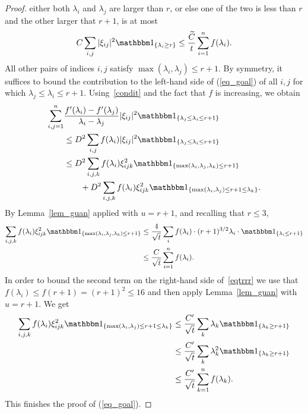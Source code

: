 \documentclass[12pt,a4paper]{article}
\renewcommand{\tilde}{\widetilde}
\theoremstyle{definition}
\begin{document}
\begin{proof}
either both $\lambda_i$ and $\lambda_j$ are larger than $r$, or
else one of the two is less than $r$ and the other larger that $r+1$, is at most
$$ C \sum_{i, j} \vert\xi_{ij} \vert^2  \mathbbm 1_{\{ \lambda_i \geq r \} } \leq \frac{\tilde{C}}{t} \sum_{i=1}^n f(\lambda_i). $$
All other pairs of indices $i,j$ satisfy $\max (\lambda_i, \lambda_j ) \leq r+1$. By symmetry, it suffices to bound the contribution to the left-hand side of (\ref{eq_goal}) 
of all $i,j$ for which $\lambda_j \leq \lambda_i \leq r+1$.
Using~\eqref{condit} and
the fact that $f$ is increasing, we obtain
\begin{equation}\label{eqtrrr}
\begin{split}
\sum_{i,j=1}^n & \frac{ f'(\lambda_i)-f'(\lambda_j) }{ \lambda_i -\lambda_j }
|\xi_{ij}|^2 \mathbbm  1_{ \{  \lambda_j \leq \lambda_i \leq r+1 \} } \\
& \leq D^2 \sum_{i,j}  f(\lambda_i) \vert \xi_{ij} \vert^2 \mathbbm  1_{ \{ \lambda_j \leq \lambda_i \leq r+1 \} }   \\
& \leq  D^2 \sum_{i,j,k} f(\lambda_i) \xi_{ijk}^2 \mathbbm  1_{ \{ \max(\lambda_i,\lambda_j,\lambda_k) \leq r+1 \} } \\
& \qquad + D^2 \sum_{i,j,k} f(\lambda_i) \xi_{ijk}^2 \mathbbm  1_{ \{ \max(\lambda_i,\lambda_j)\leq r+1 \leq \lambda_k \} }.
\end{split}
\end{equation}
By Lemma~\ref{lem_guan} applied with $u = r+1$, and recalling that $r \leq 3$,
\[
\begin{split}
\sum_{i,j,k} f(\lambda_i) \xi_{ijk}^2
\mathbbm  1_{ \{ \max(\lambda_i,\lambda_j,\lambda_k) \leq r+1 \} }
& \leq \frac{4}{\sqrt{t}}
\sum_{i} f(\lambda_i)  \cdot (r+1)^{3/2} \lambda_i  \cdot \mathbbm  1_{ \{ \lambda_i \leq r+1 \} }  \\
& \leq \frac{C}{\sqrt t} \sum_{i=1}^n f ( \lambda_i ) .
\end{split}
\]
In order to bound the second term on the right-hand side of~\eqref{eqtrrr} we 
use that $f(\lambda_i) \leq f(r+1) = (r+1)^2\leq 16$ and then apply Lemma~\ref{lem_guan}
with $u = r+1$. We get
\[
\begin{split}
\sum_{i,j,k} f(\lambda_i ) \xi_{ijk}^2 \mathbbm 1_{\{\max(\lambda_i,\lambda_j)\leq r+1 \leq \lambda_k \} }
&\leq \frac{C'}{\sqrt{t}}  \sum_k \lambda_k
\mathbbm  1_{ \{ \lambda_k \geq r+1 \} } \\
& \leq \frac{C'}{\sqrt{t}}  \sum_k \lambda_k^2
\mathbbm  1_{ \{ \lambda_k \geq r+1 \} } \\
& \leq \frac{C'}{\sqrt{t}}  \sum_{k=1}^n f(\lambda_k) .
\end{split}
\]
This finishes the proof of (\ref{eq_goal}). 
\end{proof}
\end{document}
